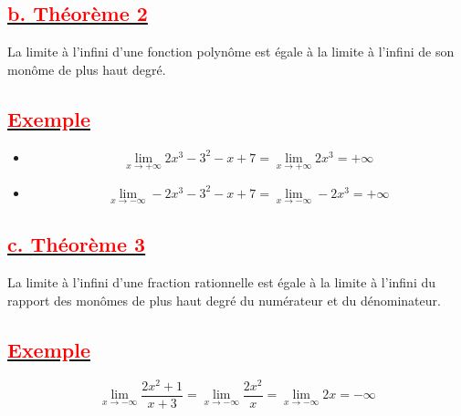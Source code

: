 \documentclass[12pt]{article}
\begin{document}
\subsection*{\underline{\textbf{\textcolor{red}{b. Théorème 2}}}}
La limite à l’infini d’une fonction polynôme est égale à la limite à l’infini de son monôme de
plus haut degré.
\subsection*{\underline{\textbf{\textcolor{red}{Exemple}}}}
\begin{itemize}
\item \[\lim_{x \to +\infty}2x^{3}-3^{2}-x+7=\lim_{x \to +\infty}2x^{3}=+\infty\]
\item \[\lim_{x \to -\infty}-2x^{3}-3^{2}-x+7=\lim_{x \to -\infty}-2x^{3}=+\infty\]
\end{itemize}
\subsection*{\underline{\textbf{\textcolor{red}{c. Théorème 3}}}}
La limite à l’infini d’une fraction rationnelle est égale à la limite à l’infini du rapport des 
monômes de plus haut degré du numérateur et du dénominateur.
\subsection*{\underline{\textbf{\textcolor{red}{Exemple}}}}
\[\lim_{x \to -\infty}\frac{2x^{2}+1}{x+3}=\lim_{x \to -\infty}\frac{2x^{2}}{x}=\lim_{x \to -\infty}2x=-\infty\]
\end{document}
